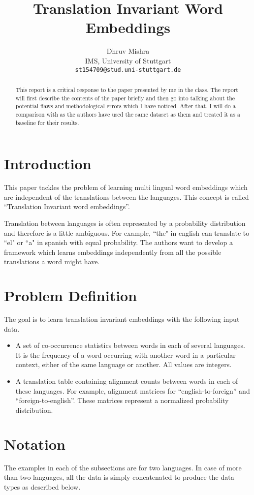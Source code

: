 \documentclass[11pt]{article}
\title{Translation Invariant Word Embeddings}
\author{Dhruv Mishra \\
IMS, University of Stuttgart \\
  {\tt st154709@stud.uni-stuttgart.de}}
\date{}
\begin{document}
\maketitle
\begin{abstract}
This report is a critical response to the paper \cite{huang2015translation} presented by me in the class. The report will first describe the contents of the paper briefly and then go into talking about the potential flaws and methodological errors which I have noticed. After that, I will do a comparison with \cite{faruqui2014improving} as the authors have used the same dataset as them and treated it as a baseline for their results.
\end{abstract}

\section{Introduction}
This paper tackles the problem of learning multi lingual word embeddings which are independent of the translations between the languages.  This concept is called “Translation Invariant word embeddings”.

Translation between languages is often represented by a probability distribution and therefore is a little ambiguous. For example, ``the" in english can translate to ``el" or ``a" in spanish with equal probability. The authors want to develop a framework which learns embeddings independently from all the possible translations a word might have.

\section{Problem Definition}
The goal is to learn translation invariant embeddings with the following input data.
\begin{itemize}
\item A set of co-occurrence statistics between words in each of several languages. It is the frequency of a word occurring with another word in a particular context, either of the same language or another. All values are integers.
\item A translation table containing alignment counts between words in each of these languages. For example, alignment matrices for “english-to-foreign” and “foreign-to-english”. These matrices represent a normalized probability distribution.
\end{itemize}

\section{Notation}
The examples in each of the subsections are for two languages. In case of more than two languages, all the data is simply concatenated to produce the data types as described below.
\end{document}

